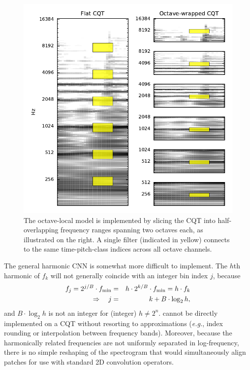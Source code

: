 \documentclass{article}
\def\eg{\emph{e.g.}}
\begin{document}
\begin{figure}
    \includegraphics[width=\columnwidth]{figs/octave-local}
    \caption{The octave-local model is implemented by slicing the CQT into half-overlapping frequency ranges spanning two octaves each, as illustrated on the right.
    A single filter (indicated in yellow) connects to the same time-pitch-class indices across all octave channels.}
\label{fig:ocnn}
\end{figure}


The general harmonic CNN is somewhat more difficult to implement.
The $h$th harmonic of $f_k$ will not generally coincide with an integer bin index $j$, because
\begin{eqnarray}
    f_j = 2^{j/B} \cdot f_{\min} &=& h \cdot 2^{k/B}\cdot f_{\min} = h \cdot f_k \notag \\
\Rightarrow \quad j &=& k + B \cdot \log_2 h,
\end{eqnarray}
and $B \cdot\log_2 h$ is not an integer for (integer) $h \neq 2^n$.
 cannot be directly implemented on a CQT without resorting to approximations (\eg, index rounding or interpolation between frequency bands).
Moreover, because the harmonically related frequencies are not uniformly separated in log-frequency, there is no simple reshaping of the spectrogram that would simultaneously align patches for use with standard 2D convolution operators.
\end{document}
